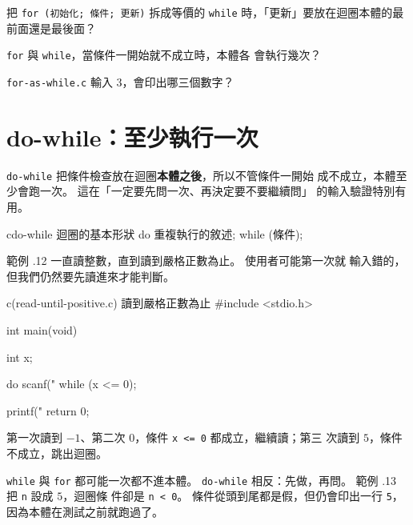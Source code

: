 \begin{drills}[label=drills:loop-for-while-equiv]
\item 把 \texttt{for (初始化; 條件; 更新)} 拆成等價的 \texttt{while}
時，「更新」要放在迴圈本體的最前面還是最後面？
\item \texttt{for} 與 \texttt{while}，當條件一開始就不成立時，本體各
會執行幾次？
\item \texttt{for-as-while.c} 輸入 $3$，會印出哪三個數字？
\end{drills}

\section{do-while：至少執行一次}
\label{sec:loop-do-while}

\texttt{do-while} 把條件檢查放在迴圈\textbf{本體之後}，所以不管條件一開始
成不成立，本體至少會跑一次。 這在「一定要先問一次、再決定要不要繼續問」
的輸入驗證特別有用。

\begin{code}{c}{do-while 迴圈的基本形狀}
do {
    重複執行的敘述;
} while (條件);
\end{code}

範例 \thechapter.12 一直讀整數，直到讀到嚴格正數為止。 使用者可能第一次就
輸入錯的，但我們仍然要先讀進來才能判斷。

\begin{example}{c}{(read-until-positive.c) 讀到嚴格正數為止}
#include <stdio.h>

int main(void) {
    int x;

    do {
        scanf("%
    } while (x <= 0);

    printf("%
    return 0;
}
\end{example}


第一次讀到 $-1$、第二次 $0$，條件 \texttt{x <= 0} 都成立，繼續讀；第三
次讀到 $5$，條件不成立，跳出迴圈。


\texttt{while} 與 \texttt{for} 都可能一次都不進本體。 \texttt{do-while}
相反：先做，再問。 範例 \thechapter.13 把 \texttt{n} 設成 $5$，迴圈條
件卻是 \texttt{n < 0}。 條件從頭到尾都是假，但仍會印出一行 \texttt{5}，
因為本體在測試之前就跑過了。

